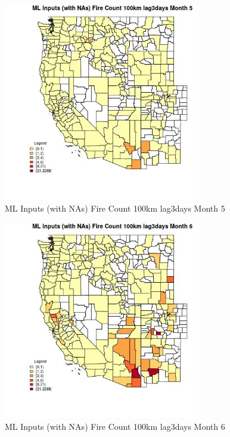 \begin{figure} 
\centering  
\includegraphics[width=0.77\textwidth]{Code_Outputs/Report_ML_input_PM25_Step4_part_e_de_duplicated_aves_compiled_2019-05-21wNAs_CountyFire_Count_100km_lag3daysmedianMonth5.jpg} 
\caption{\label{fig:Report_ML_input_PM25_Step4_part_e_de_duplicated_aves_compiled_2019-05-21wNAsCountyFire_Count_100km_lag3daysmedianMonth5}ML Inputs (with NAs) Fire Count 100km lag3days Month 5} 
\end{figure} 
 

\begin{figure} 
\centering  
\includegraphics[width=0.77\textwidth]{Code_Outputs/Report_ML_input_PM25_Step4_part_e_de_duplicated_aves_compiled_2019-05-21wNAs_CountyFire_Count_100km_lag3daysmedianMonth6.jpg} 
\caption{\label{fig:Report_ML_input_PM25_Step4_part_e_de_duplicated_aves_compiled_2019-05-21wNAsCountyFire_Count_100km_lag3daysmedianMonth6}ML Inputs (with NAs) Fire Count 100km lag3days Month 6} 
\end{figure} 
 

